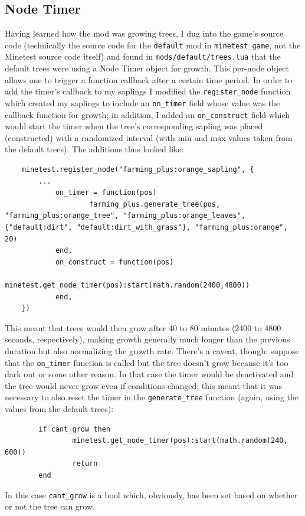 \documentclass{article}
\begin{document}
\subsection{Node Timer}
Having learned how the mod was growing trees, I dug into the game's source code (technically the source code for the \texttt{default} mod in \texttt{minetest_game}, not the Minetest source code itself) and found in \texttt{mods/default/trees.lua} that the default trees were using a Node Timer object for growth.  This per-node object allows one to trigger a function callback after a certain time period.  In order to add the timer's callback to my saplings I modified the \texttt{register_node} function which created my saplings to include an \texttt{on_timer} field whose value was the callback function for growth; in addition, I added an \texttt{on_construct} field which would start the timer when the tree's corresponding sapling was placed (constructed) with a randomized interval (with min and max values taken from the default trees).  The additions thus looked like:
\begin{verbatim}
	minetest.register_node("farming_plus:orange_sapling", {
		...
	        on_timer = function(pos)
	                farming_plus.generate_tree(pos, "farming_plus:orange_tree", "farming_plus:orange_leaves", {"default:dirt", "default:dirt_with_grass"}, "farming_plus:orange", 20)
	        end,
	        on_construct = function(pos)
	                minetest.get_node_timer(pos):start(math.random(2400,4800))
	        end,
	})
\end{verbatim}
This meant that trees would then grow after 40 to 80 minutes (2400 to 4800 seconds, respectively), making growth generally much longer than the previous duration but also normalizing the growth rate.  There's a caveat, though: suppose that the \texttt{on_timer} function is called but the tree doesn't grow because it's too dark out or some other reason.  In that case the timer would be deactivated and the tree would never grow even if conditions changed; this meant that it was necessary to also reset the timer in the \texttt{generate_tree} function (again, using the values from the default trees):
\begin{verbatim}
        if cant_grow then
                minetest.get_node_timer(pos):start(math.random(240, 600))
                return
        end
\end{verbatim}
In this case \texttt{cant_grow} is a bool which, obviously, has been set based on whether or not the tree can grow.
\end{document}
